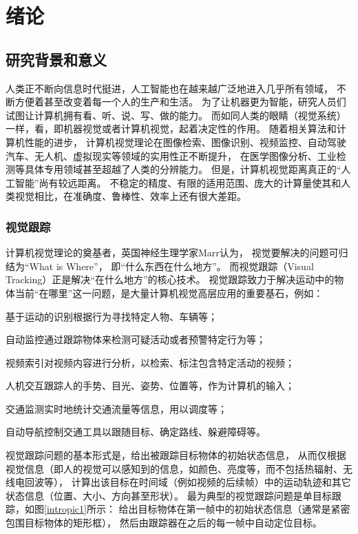 \chapter{绪论}

\section{研究背景和意义}
人类正不断向信息时代挺进，人工智能也在越来越广泛地进入几乎所有领域，
不断方便着甚至改变着每一个人的生产和生活。
为了让机器更为智能，研究人员们试图让计算机拥有看、听、说、写、做的能力。
而如同人类的眼睛（视觉系统）一样，看，即机器视觉或者计算机视觉，起着决定性的作用。
随着相关算法和计算机性能的进步，
计算机视觉理论在图像检索、图像识别、视频监控、自动驾驶汽车、无人机、虚拟现实等领域的实用性正不断提升，
在医学图像分析、工业检测等具体专用领域甚至超越了人类的分辨能力。
但是，计算机视觉距离真正的“人工智能”尚有较远距离。
不稳定的精度、有限的适用范围、庞大的计算量使其和人类视觉相比，在准确度、鲁棒性、效率上还有很大差距。

\subsection{视觉跟踪}
计算机视觉理论的奠基者，英国神经生理学家Marr认为，
视觉要解决的问题可归结为``What is Where''，
即``什么东西在什么地方''。
而视觉跟踪（Visual Tracking）正是解决``在什么地方''的核心技术。
视觉跟踪致力于解决运动中的物体当前``在哪里''这一问题，是大量计算机视觉高层应用的重要基石，例如：
\begin{compactitem}
\item 基于运动的识别\pozhehao 根据行为寻找特定人物、车辆等；
\item 自动监控\pozhehao 通过跟踪物体来检测可疑活动或者预警特定行为等；
\item 视频索引\pozhehao 对视频内容进行分析，以检索、标注包含特定活动的视频；
\item 人机交互\pozhehao 跟踪人的手势、目光、姿势、位置等，作为计算机的输入；
\item 交通监测\pozhehao 实时地统计交通流量等信息，用以调度等；
\item 自动导航\pozhehao 控制交通工具以跟随目标、确定路线、躲避障碍等。
\end{compactitem}

视觉跟踪问题的基本形式是，给出被跟踪目标物体的初始状态信息，
从而仅根据视觉信息（即人的视觉可以感知到的信息，如颜色、亮度等，而不包括热辐射、无线电回波等），
计算出该目标在时间域（例如视频的后续帧）中的运动轨迹和其它状态信息（位置、大小、方向甚至形状）。
最为典型的视觉跟踪问题是单目标跟踪，如图\ref{intropic1}所示：
给出目标物体在第一帧中的初始状态信息（通常是紧密包围目标物体的矩形框），
然后由跟踪器在之后的每一帧中自动定位目标。

